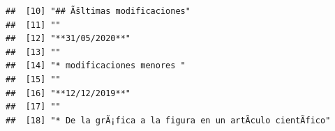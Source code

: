 \documentclass[
]{book}
\begin{document}
\begin{verbatim}
##  [10] "## Ãšltimas modificaciones"                                                                                                                                                                                                                                                                              
##  [11] ""                                                                                                                                                                                                                                                                                                        
##  [12] "**31/05/2020**"                                                                                                                                                                                                                                                                                          
##  [13] ""                                                                                                                                                                                                                                                                                                        
##  [14] "* modificaciones menores "                                                                                                                                                                                                                                                                               
##  [15] ""                                                                                                                                                                                                                                                                                                        
##  [16] "**12/12/2019**"                                                                                                                                                                                                                                                                                          
##  [17] ""                                                                                                                                                                                                                                                                                                        
##  [18] "* De la grÃ¡fica a la figura en un artÃ­culo cientÃ­fico"                                                                                                                                                                                                                                                

\end{verbatim}
\end{document}
